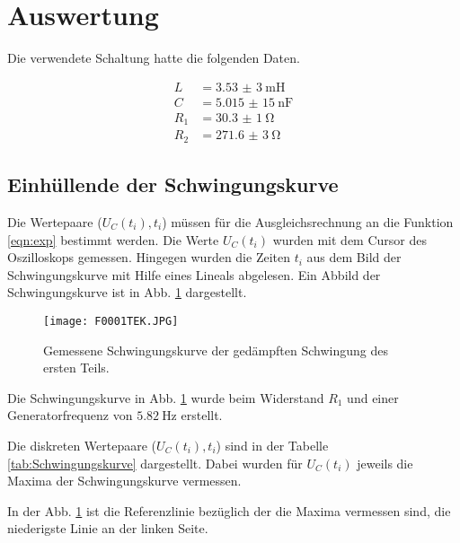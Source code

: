 
\section{Auswertung}

Die verwendete Schaltung hatte die folgenden Daten.

\begin{align*}
  L &= \SI{3,53(3)}{\milli\henry} \\
  C &= \SI{5,015(15)}{\nano\farad} \\
  R_1 &= \SI{30,3(1)}{\ohm} \\
  R_2 &= \SI{271,6(3)}{\ohm}
\end{align*}

\subsection{Einhüllende der Schwingungskurve}

Die Wertepaare ($U_C(t_i), t_i$) müssen für die Ausgleichsrechnung an die Funktion
\eqref{eqn:exp} bestimmt werden.
Die Werte $U_C(t_i)$ wurden mit dem Cursor des Oszilloskops gemessen.
Hingegen wurden die Zeiten $t_i$ aus dem Bild der Schwingungskurve mit
Hilfe eines Lineals abgelesen. Ein Abbild der Schwingungskurve ist in Abb.
\ref{fig:Schwingungskurve} dargestellt.

\begin{figure}
  \centering
  \texttt{[image: F0001TEK.JPG]}
  \caption{Gemessene Schwingungskurve der gedämpften Schwingung des ersten Teils.}
  \label{fig:Schwingungskurve}
\end{figure}

Die Schwingungskurve in Abb. \ref{fig:Schwingungskurve} wurde beim
Widerstand $R_1$ und einer Generatorfrequenz von $\SI{5,82}{\hertz}$ erstellt.

Die diskreten Wertepaare ($U_C(t_i), t_i$) sind in der Tabelle \ref{tab:Schwingungskurve}
dargestellt. Dabei wurden für $U_C(t_i)$ jeweils die Maxima der Schwingungskurve
vermessen.

In der Abb. \ref{fig:Schwingungskurve} ist die Referenzlinie bezüglich der die Maxima
vermessen sind, die niederigste Linie an der linken Seite.

